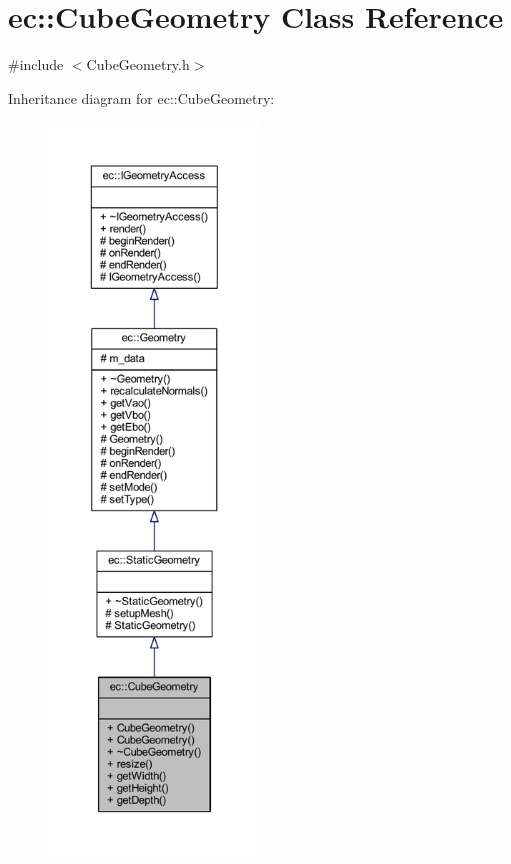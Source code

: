 \hypertarget{classec_1_1_cube_geometry}{}\section{ec\+:\+:Cube\+Geometry Class Reference}
\label{classec_1_1_cube_geometry}


{\ttfamily \#include $<$Cube\+Geometry.\+h$>$}



Inheritance diagram for ec\+:\+:Cube\+Geometry\+:\nopagebreak
\begin{figure}[H]
\begin{center}
\leavevmode
\includegraphics[height=550pt]{classec_1_1_cube_geometry__inherit__graph}
\end{center}
\end{figure}


